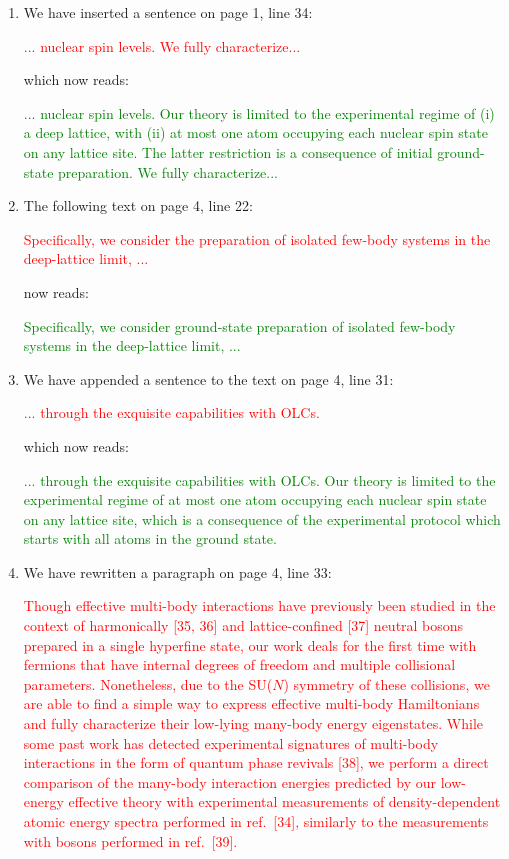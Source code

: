 \documentclass[preprint,showkeys,nofootinbib]{revtex4-1}
\newcommand{\1}{\mathds{1}}
\newcommand{\red}[1]{\textcolor{red}{#1}}
\newcommand{\green}[1]{\textcolor{green}{#1}}
\newcounter{point}
\newcommand{\step}{\stepcounter{point}\setcounter{enumi}{0}}
\begin{document}
\setcounter{point}{1}
\begin{enumerate}[label=(R1.\arabic{point}.\arabic*)]

  \step
\item We have inserted a sentence on page 1, line 34:

  \red{... nuclear spin levels.  We fully characterize...}

  which now reads:

  \green{... nuclear spin levels.  Our theory is limited to the
    experimental regime of (i) a deep lattice, with (ii) at most one
    atom occupying each nuclear spin state on any lattice site.  The
    latter restriction is a consequence of initial ground-state
    preparation.  We fully characterize...}


\item The following text on page 4, line 22:

  \red{Specifically, we consider the preparation of isolated few-body
    systems in the deep-lattice limit, ...}

  now reads:

  \green{Specifically, we consider ground-state preparation of
    isolated few-body systems in the deep-lattice limit, ...}


\item We have appended a sentence to the text on page 4, line 31:

  \red{... through the exquisite capabilities with OLCs.}

  which now reads:

  \green{... through the exquisite capabilities with OLCs.  Our theory
    is limited to the experimental regime of at most one atom
    occupying each nuclear spin state on any lattice site, which is a
    consequence of the experimental protocol which starts with all
    atoms in the ground state.}


\item We have rewritten a paragraph on page 4, line 33:

  \red{Though effective multi-body interactions have previously been
    studied in the context of harmonically [35, 36] and
    lattice-confined [37] neutral bosons prepared in a single
    hyperfine state, our work deals for the first time with fermions
    that have internal degrees of freedom and multiple collisional
    parameters.  Nonetheless, due to the SU($N$) symmetry of these
    collisions, we are able to find a simple way to express effective
    multi-body Hamiltonians and fully characterize their low-lying
    many-body energy eigenstates.  While some past work has detected
    experimental signatures of multi-body interactions in the form of
    quantum phase revivals [38], we perform a direct comparison of the
    many-body interaction energies predicted by our low-energy
    effective theory with experimental measurements of
    density-dependent atomic energy spectra performed in ref.~[34],
    similarly to the measurements with bosons performed in ref.~[39].}


\end{enumerate}
\end{document}

